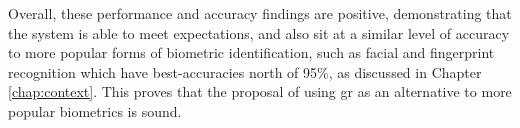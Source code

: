 Overall, these performance and accuracy findings are positive, demonstrating that the system is able to meet expectations, and also sit at a similar level of accuracy to more popular forms of biometric identification, such as facial and fingerprint recognition which have best-accuracies north of 95\%, as discussed in Chapter \ref{chap:context}.
This proves that the proposal of using \ac{gr} as an alternative to more popular biometrics is sound.